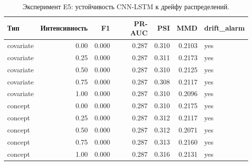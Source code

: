 \begin{table}[H]
\centering
\caption{Эксперимент E5: устойчивость CNN-LSTM к дрейфу распределений.}
\label{tab:E5-drift}
\renewcommand{\arraystretch}{1.15}
\begin{tabular}{lrrrrrl}
\toprule
\textbf{Тип} & \textbf{Интенсивность} & \textbf{F1} & \textbf{PR-AUC} & \textbf{PSI} & \textbf{MMD} & \textbf{drift\_alarm} \\
\midrule
covariate & 0.00 & 0.000 & 0.287 & 0.310 & 0.2103 & yes \\
covariate & 0.25 & 0.000 & 0.287 & 0.311 & 0.2173 & yes \\
covariate & 0.50 & 0.000 & 0.287 & 0.310 & 0.2125 & yes \\
covariate & 0.75 & 0.000 & 0.287 & 0.308 & 0.2117 & yes \\
covariate & 1.00 & 0.000 & 0.287 & 0.310 & 0.2096 & yes \\
concept & 0.00 & 0.000 & 0.287 & 0.310 & 0.2175 & yes \\
concept & 0.25 & 0.000 & 0.287 & 0.312 & 0.2117 & yes \\
concept & 0.50 & 0.000 & 0.287 & 0.312 & 0.2071 & yes \\
concept & 0.75 & 0.000 & 0.287 & 0.313 & 0.2160 & yes \\
concept & 1.00 & 0.000 & 0.287 & 0.316 & 0.2131 & yes \\
\bottomrule
\end{tabular}
\end{table}